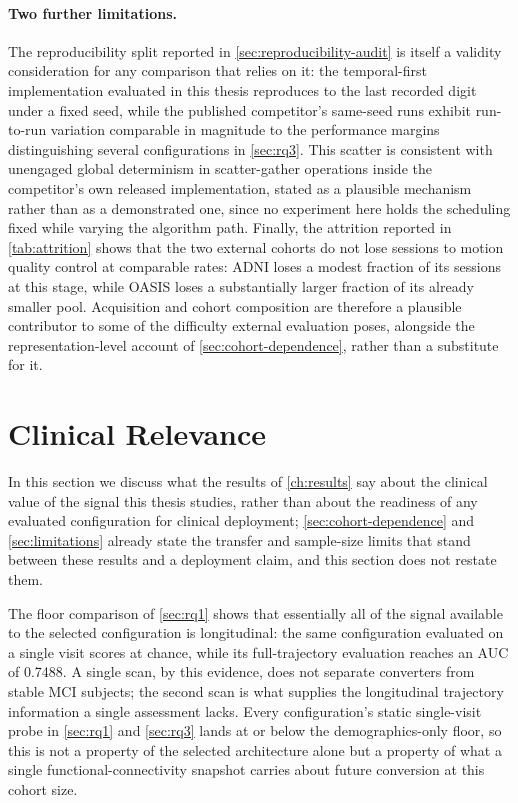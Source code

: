 \paragraph{Two further limitations.} The reproducibility split reported in
\autoref{sec:reproducibility-audit} is itself a validity consideration for any comparison
that relies on it: the temporal-first implementation evaluated in this thesis reproduces to
the last recorded digit under a fixed seed, while the published competitor's same-seed
runs exhibit run-to-run variation comparable in magnitude to the performance margins
distinguishing several configurations in \autoref{sec:rq3}. This scatter is consistent with
unengaged global determinism in scatter-gather operations inside the competitor's own
released implementation, stated as a plausible mechanism rather than as a demonstrated one,
since no experiment here holds the scheduling fixed while varying the algorithm path. Finally, the attrition reported in
\autoref{tab:attrition} shows that the two external cohorts do not lose sessions to motion
quality control at comparable rates: \ac{ADNI} loses a modest fraction of its sessions at
this stage, while \ac{OASIS} loses a substantially larger fraction of its already smaller
pool. Acquisition and cohort composition are therefore a plausible contributor to some of
the difficulty external evaluation poses, alongside the representation-level account of
\autoref{sec:cohort-dependence}, rather than a substitute for it.

\section{Clinical Relevance}\label{sec:clinical-relevance}

In this section we discuss what the results of \autoref{ch:results} say about the clinical
value of the signal this thesis studies, rather than about the readiness of any evaluated
configuration for clinical deployment; \autoref{sec:cohort-dependence} and
\autoref{sec:limitations} already state the transfer and sample-size limits that stand between
these results and a deployment claim, and this section does not restate them.

The floor comparison of \autoref{sec:rq1} shows that essentially all of the signal
available to the selected configuration is longitudinal: the same configuration evaluated
on a single visit scores at chance, while its full-trajectory evaluation reaches an
\ac{AUC} of 0.7488. A single scan, by this evidence, does not separate converters from stable
\ac{MCI} subjects; the second scan is what supplies the longitudinal trajectory information a
single assessment lacks. Every configuration's static single-visit probe in \autoref{sec:rq1} and
\autoref{sec:rq3} lands at or below the demographics-only floor, so this is not a property
of the selected architecture alone but a property of what a single functional-connectivity
snapshot carries about future conversion at this cohort size.

